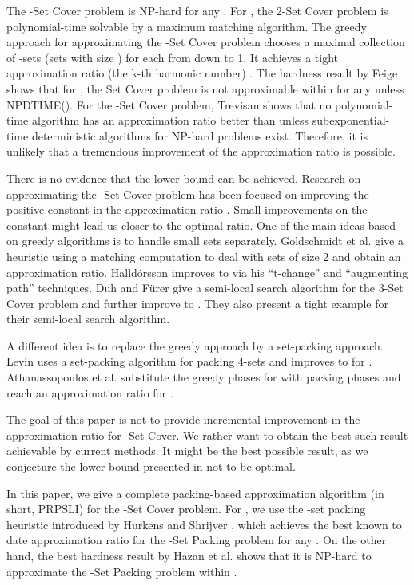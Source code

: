 \documentclass[runningheads,a4paper]{llncs}
\numberwithin{equation}{section}
\begin{document}
The -Set Cover problem is NP-hard for any . For , the 2-Set Cover problem is polynomial-time solvable by a maximum matching algorithm. The greedy approach for approximating the -Set Cover problem chooses a maximal collection of -sets (sets with size ) for each  from  down to 1. It achieves a tight approximation ratio  (the k-th harmonic number) \cite{johnson}. The hardness result by Feige \cite{feige} shows that for , the Set Cover problem is not approximable within  for any  unless NPDTIME(). For the -Set Cover problem, Trevisan \cite{trevisan} shows that no polynomial-time algorithm has an approximation ratio better than  unless subexponential-time deterministic algorithms for NP-hard problems exist. Therefore, it is unlikely that a tremendous improvement of the approximation ratio is possible.

There is no evidence that the  lower bound can be achieved. Research on approximating the -Set Cover problem has been focused on improving the positive constant  in the approximation ratio . Small improvements on the constant might lead us closer to the optimal ratio. One of the main ideas based on greedy algorithms is to handle small sets separately. Goldschmidt et al. \cite{gold} give a heuristic using a matching computation to deal with sets of size 2 and obtain an  approximation ratio. Halld\'{o}rsson \cite{hall2} improves  to  via his ``t-change''  and ``augmenting path'' techniques. Duh and F\"{u}rer \cite{furer} give a semi-local search algorithm for the 3-Set Cover problem and further improve  to . They also present a tight example for their semi-local search algorithm.

A different idea is to replace the greedy approach by a set-packing approach. Levin \cite{levin} uses a set-packing algorithm for packing 4-sets and improves  to  for . Athanassopoulos et al. \cite{lp} substitute the greedy phases for  with packing phases and reach an approximation ratio  for .

The goal of this paper is not to provide incremental improvement in the approximation ratio for -Set Cover. We rather want to obtain the best such result achievable by current methods. It might be the best possible result, as we conjecture the lower bound presented in \cite{trevisan} not to be optimal.

In this paper, we give a complete packing-based approximation algorithm (in short, PRPSLI) for the -Set Cover problem. For , we use the -set packing heuristic introduced by Hurkens and Shrijver \cite{schrijver}, which achieves the best known to date approximation ratio  for the -Set Packing problem for any . On the other hand, the best hardness result by Hazan et al. \cite{hazan} shows that it is NP-hard to approximate the -Set Packing problem within .
\end{document}
